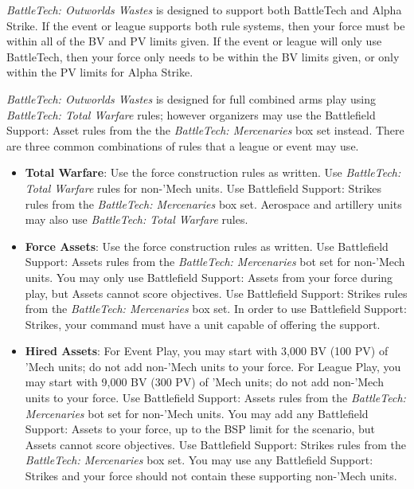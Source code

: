 \emph{BattleTech: Outworlds Wastes} is designed to support both BattleTech and Alpha Strike.
If the event or league supports both rule systems, then your force must be within all of the BV and PV limits given.
If the event or league will only use BattleTech, then your force only needs to be within the BV limits given, or only within the PV limits for Alpha Strike.

\emph{BattleTech: Outworlds Wastes} is designed for full combined arms play using \emph{BattleTech: Total Warfare} rules; however organizers may use the Battlefield Support: Asset rules from the the \emph{BattleTech: Mercenaries} box set instead.
There are three common combinations of rules that a league or event may use.

\begin{itemize}

  \item {\bfseries Total Warfare}: Use the force construction rules as written.
    Use \emph{BattleTech: Total Warfare} rules for non-'Mech units.
    Use Battlefield Support: Strikes rules from the \emph{BattleTech: Mercenaries} box set.
    Aerospace and artillery units may also use \emph{BattleTech: Total Warfare} rules.

  \item {\bfseries Force Assets}: Use the force construction rules as written.
    Use Battlefield Support: Assets rules from the \emph{BattleTech: Mercenaries} bot set for non-'Mech units.
    You may only use Battlefield Support: Assets from your force during play, but Assets cannot score objectives.
    Use Battlefield Support: Strikes rules from the \emph{BattleTech: Mercenaries} box set.
    In order to use Battlefield Support: Strikes, your command must have a unit capable of offering the support.

  \item {\bfseries Hired Assets}: For Event Play, you may start with 3,000 BV (100 PV) of 'Mech units; do not add non-'Mech units to your force.
    For League Play, you may start with 9,000 BV (300 PV) of 'Mech units; do not add non-'Mech units to your force.
    Use Battlefield Support: Assets rules from the \emph{BattleTech: Mercenaries} bot set for non-'Mech units.
    You may add any Battlefield Support: Assets to your force, up to the BSP limit for the scenario, but Assets cannot score objectives.
    Use Battlefield Support: Strikes rules from the \emph{BattleTech: Mercenaries} box set.
    You may use any Battlefield Support: Strikes and your force should not contain these supporting non-'Mech units.

\end{itemize}
